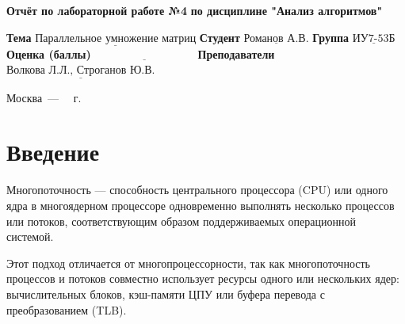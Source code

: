 \documentclass[12pt]{report}
\begin{document}
\begin{titlepage}
	
	\begin{center}
		\noindent\begin{minipage}{1.3\textwidth}\centering
			\Large\textbf{  Отчёт по лабораторной работе №4}\newline
			\textbf{по дисциплине "Анализ алгоритмов"}\newline\newline
		\end{minipage}
	\end{center}
	
	\noindent\textbf{Тема} $\underline{\text{Параллельное умножение матриц}}$\newline\newline
	\noindent\textbf{Студент} $\underline{\text{Романов А.В.}}$\newline\newline
	\noindent\textbf{Группа} $\underline{\text{ИУ7-53Б}}$\newline\newline
	\noindent\textbf{Оценка (баллы)} $\underline{\text{~~~~~~~~~~~~~~~~~~~~~~~~~~~}}$\newline\newline
	\noindent\textbf{Преподаватели} $\underline{\text{Волкова Л.Л., Строганов Ю.В.}}$\newline\newline\newline
	
	\begin{center}
		\vfill
		Москва~---~\the\year
		~г.
	\end{center}
\end{titlepage}

\setcounter{page}{2}
\tableofcontents

\newpage
\chapter*{Введение}

Многопоточность — способность центрального процессора (CPU) или одного ядра в многоядерном процессоре одновременно выполнять несколько процессов или потоков, соответствующим образом поддерживаемых операционной системой.

Этот подход отличается от многопроцессорности, так как многопоточность процессов и потоков совместно использует ресурсы одного или нескольких ядер: вычислительных блоков, кэш-памяти ЦПУ или буфера перевода с преобразованием (TLB).
\end{document}

